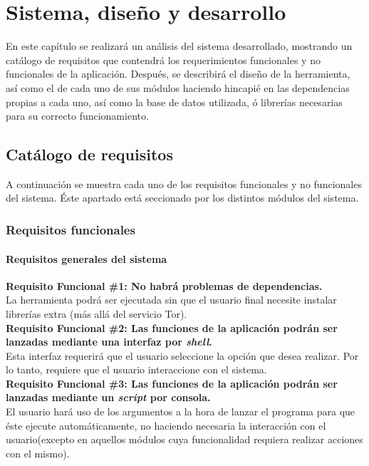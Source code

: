 \chapter{Sistema, diseño y desarrollo}
\label{chap:sistemadesarrollado}

En este capítulo se realizará un análisis del sistema desarrollado, mostrando un catálogo de requisitos que contendrá los requerimientos funcionales y no funcionales de la aplicación.
Después, se describirá el diseño de la herramienta, así como el de cada  uno  de  sus módulos haciendo hincapié en las dependencias propias a cada uno, así como la base de datos utilizada, ó librerías necesarias para su correcto funcionamiento.

\section{Catálogo de requisitos}

A continuación se muestra cada uno de los requisitos funcionales y no funcionales del sistema. Éste apartado está seccionado por los distintos módulos del sistema.

\subsection{Requisitos funcionales}
\subsubsection{Requisitos generales del sistema}
\begin{adjustwidth}{0.5cm}{}
\textbf{Requisito Funcional \#1: No habrá problemas de dependencias.}\\
La herramienta podrá ser ejecutada sin que el usuario final necesite instalar librerías extra (más allá del servicio Tor).\\
\linebreak
\textbf{Requisito Funcional \#2: Las funciones de la aplicación podrán ser lanzadas mediante una interfaz por \textit{shell}.}\\
Esta interfaz requerirá que el usuario seleccione la opción que desea realizar. Por lo tanto, requiere que el usuario interaccione con el sistema.\\	
\linebreak
\textbf{Requisito Funcional \#3: Las funciones de la aplicación podrán ser lanzadas mediante un \textit{script} por consola.}\\
El usuario hará uso de los argumentos a la hora de lanzar el programa para que éste ejecute automáticamente, no haciendo necesaria la interacción con el usuario(excepto en aquellos módulos cuya funcionalidad requiera realizar acciones con el mismo).\\
\linebreak
\end{adjustwidth}
